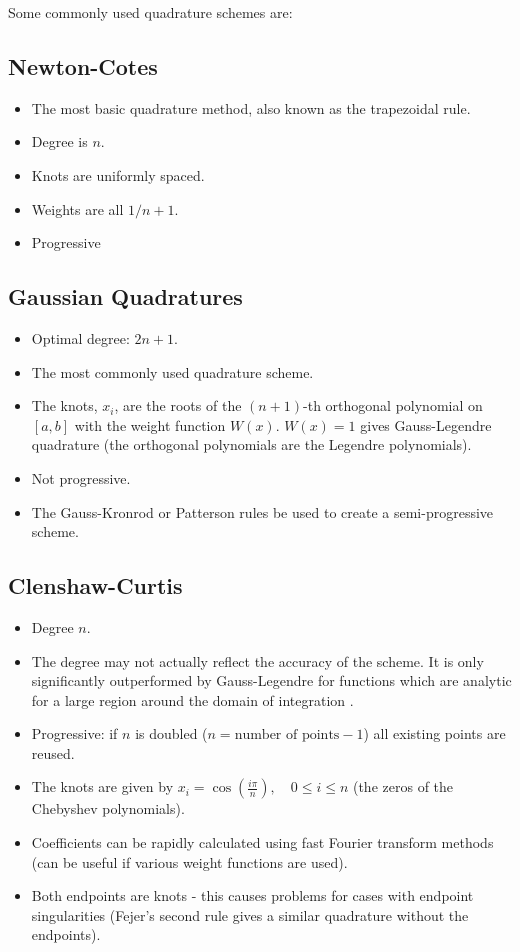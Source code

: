Some commonly used quadrature schemes are:

\subsection{Newton-Cotes}
\begin{itemize}
\item The most basic quadrature method, also known as the trapezoidal rule.
\item Degree is $n$.
\item Knots are uniformly spaced.
\item Weights are all $1/n + 1$.
\item Progressive
\end{itemize}

\subsection{Gaussian Quadratures}
\begin{itemize}
\item Optimal degree: $2n +1$.
\item The most commonly used quadrature scheme.
\item The knots, $x_i$, are the roots of the $(n+1)$-th orthogonal polynomial on $[a,b]$ with the weight function $W(x)$. $W(x) = 1$ gives Gauss-Legendre quadrature (the orthogonal polynomials are the Legendre polynomials).
\item Not progressive.
\item The Gauss-Kronrod or Patterson rules be used to create a semi-progressive scheme.
\end{itemize}

\subsection{Clenshaw-Curtis}
\begin{itemize}
\item Degree $n$.
\item The degree may not actually reflect the accuracy of the scheme. It is only significantly outperformed by Gauss-Legendre for functions which are analytic for a large region around the domain of integration \cite{Trefethen2008}.
\item Progressive: if $n$ is doubled ($n = \text{number of points} - 1$) all existing points are reused.
\item The knots are given by $x_i = \cos(\frac{i \pi}{n}), \quad 0 \leq i \leq n$ (the zeros of the Chebyshev polynomials).
\item Coefficients can be rapidly calculated using fast Fourier transform methods (can be useful if various weight functions are used).
\item Both endpoints are knots - this causes problems for cases with endpoint singularities (Fejer's second rule gives a similar quadrature without the endpoints).
\end{itemize}


